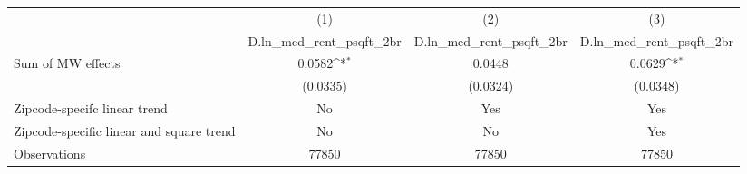 {
\def\sym#1{\ifmmode^{#1}\else\(^{#1}\)\fi}
\begin{tabular}{l*{3}{c}}
\hline\hline
          &\multicolumn{1}{c}{(1)}&\multicolumn{1}{c}{(2)}&\multicolumn{1}{c}{(3)}\\
          &\multicolumn{1}{c}{D.ln\_med\_rent\_psqft\_2br}&\multicolumn{1}{c}{D.ln\_med\_rent\_psqft\_2br}&\multicolumn{1}{c}{D.ln\_med\_rent\_psqft\_2br}\\
\hline
Sum of MW effects&   0.0582\sym{*}  &   0.0448         &   0.0629\sym{*}  \\
          & (0.0335)         & (0.0324)         & (0.0348)         \\
\hline
Zipcode-specifc linear trend&       No         &      Yes         &      Yes         \\
Zipcode-specific linear and square trend&       No         &       No         &      Yes         \\
Observations&    77850         &    77850         &    77850         \\
\hline\hline
\end{tabular}
}

